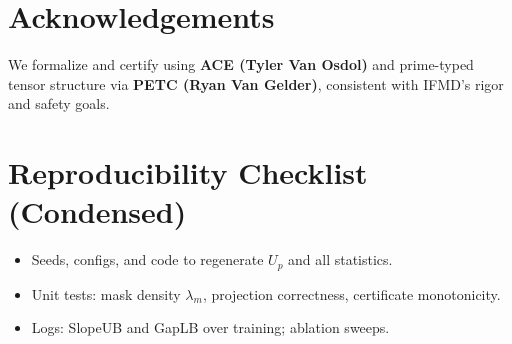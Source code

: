 \documentclass[11pt]{article}
\theoremstyle{definition}
\theoremstyle{remark}
\begin{document}
\section*{Acknowledgements}
We formalize and certify using \textbf{ACE (Tyler Van Osdol)} and prime-typed tensor structure via \textbf{PETC (Ryan Van Gelder)}, consistent with IFMD's rigor and safety goals.

\section*{Reproducibility Checklist (Condensed)}
\begin{itemize}[leftmargin=*]
  \item Seeds, configs, and code to regenerate $U_p$ and all statistics.
  \item Unit tests: mask density $\lambda_m$, projection correctness, certificate monotonicity.
  \item Logs: SlopeUB and GapLB over training; ablation sweeps.
\end{itemize}

\nocite{*}


\end{document}
